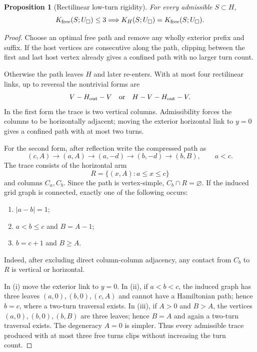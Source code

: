 \documentclass[11pt]{article}
\newtheorem{proposition}[theorem]{Proposition}
\theoremstyle{definition}
\begin{document}
\begin{proposition}[Rectilinear low-turn rigidity]\label{prop:rect-rigidity}
For every admissible $S\subset H$,
\[
K_{\rm free}(S;U_\square)\le3\Longrightarrow K_H(S;U_\square)=K_{\rm free}(S;U_\square).
\]
\end{proposition}
\begin{proof}
Choose an optimal free path and remove any wholly exterior prefix and suffix.  If the host vertices are consecutive along the path, clipping between the first and last host vertex already gives a confined path with no larger turn count.

Otherwise the path leaves $H$ and later re-enters.  With at most four rectilinear links, up to reversal the nontrivial forms are
\[
V-H_{\rm out}-V
\quad\text{or}\quad
H-V-H_{\rm out}-V.
\]
In the first form the trace is two vertical columns.  Admissibility forces the columns to be horizontally adjacent; moving the exterior horizontal link to $y=0$ gives a confined path with at most two turns.

For the second form, after reflection write the compressed path as
\[
(c,A)\to(a,A)\to(a,-d)\to(b,-d)\to(b,B),\qquad a<c.
\]
The trace consists of the horizontal arm
\[
R=\{(x,A):a\le x\le c\}
\]
and columns $C_a,C_b$.  Since the path is vertex-simple, $C_b\cap R=\varnothing$.  If the induced grid graph is connected, exactly one of the following occurs:
\begin{enumerate}[label=(\roman*)]
\item $|a-b|=1$;
\item $a<b\le c$ and $B=A-1$;
\item $b=c+1$ and $B\ge A$.
\end{enumerate}
Indeed, after excluding direct column-column adjacency, any contact from $C_b$ to $R$ is vertical or horizontal.

In (i) move the exterior link to $y=0$.  In (ii), if $a<b<c$, the induced graph has three leaves $(a,0),(b,0),(c,A)$ and cannot have a Hamiltonian path; hence $b=c$, where a two-turn traversal exists.  In (iii), if $A>0$ and $B>A$, the vertices $(a,0),(b,0),(b,B)$ are three leaves; hence $B=A$ and again a two-turn traversal exists.  The degeneracy $A=0$ is simpler.  Thus every admissible trace produced with at most three free turns clips without increasing the turn count.
\end{proof}
\end{document}
